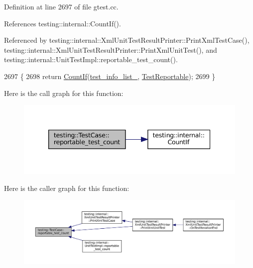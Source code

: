 Definition at line 2697 of file gtest.\+cc.



References testing\+::internal\+::\+Count\+If().



Referenced by testing\+::internal\+::\+Xml\+Unit\+Test\+Result\+Printer\+::\+Print\+Xml\+Test\+Case(), testing\+::internal\+::\+Xml\+Unit\+Test\+Result\+Printer\+::\+Print\+Xml\+Unit\+Test(), and testing\+::internal\+::\+Unit\+Test\+Impl\+::reportable\+\_\+test\+\_\+count().


\begin{DoxyCode}
2697                                           \{
2698   \textcolor{keywordflow}{return} \hyperlink{namespacetesting_1_1internal_a1e77a774d910346eff11a86d8df783a5}{CountIf}(\hyperlink{classtesting_1_1TestCase_adce272a48399dd67a7bdd14fa7e99b80}{test\_info\_list\_}, \hyperlink{classtesting_1_1TestCase_a2c3767df71e07939b32f19ef9c6ed271}{TestReportable});
2699 \}
\end{DoxyCode}
Here is the call graph for this function\+:
\nopagebreak
\begin{figure}[H]
\begin{center}
\leavevmode
\includegraphics[width=339pt]{classtesting_1_1TestCase_ae4e69f1a77b6aba274981e987e50acab_cgraph}
\end{center}
\end{figure}
Here is the caller graph for this function\+:
\nopagebreak
\begin{figure}[H]
\begin{center}
\leavevmode
\includegraphics[width=350pt]{classtesting_1_1TestCase_ae4e69f1a77b6aba274981e987e50acab_icgraph}
\end{center}
\end{figure}
\mbox{\label{classtesting_1_1TestCase_a6f5b3724cd5a8e446cd48a6150d08cde}} 
